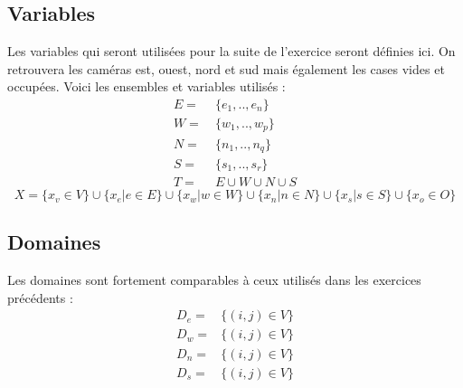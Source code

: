 \documentclass[a4paper]{article}
\begin{document}
\subsection{Variables}
Les variables qui seront utilisées pour la suite de l'exercice seront définies ici. On retrouvera les caméras est, ouest, nord et sud mais également les cases vides et occupées. Voici les ensembles et variables utilisés : 
\begin{align*}
E =& \ \{ e_1,.., e_n \} \\
W =& \  \{ w_1,.., w_p \} \\
N =& \  \{ n_1,.., n_q \} \\
S =& \  \{ s_1,.., s_r \} \\
T =& \ E \cup W \cup N \cup S
\end{align*}
\begin{equation*}
X = \{x_v \in V \} \cup \{x_e | e \in E \} \cup \{x_w | w \in W\} \cup \{x_n | n \in N\} \cup \{x_s | s \in S \} \cup \{x_o \in O\} 
\end{equation*}
\subsection{Domaines}
Les domaines sont fortement comparables à ceux utilisés dans les exercices précédents : 
\begin{align*}
D_e =& \{ (i,j) \in V \} \\ 
D_w =& \{ (i,j) \in V \} \\ 
D_n =& \{ (i,j) \in V \} \\ 
D_s =& \{ (i,j) \in V \} \\ 
\end{align*}
\end{document}
